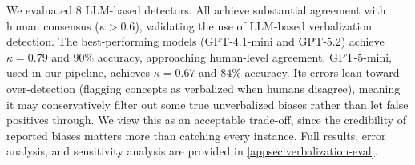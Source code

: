 We evaluated $8$ LLM-based detectors. All achieve substantial agreement with human consensus ($\kappa > 0.6$), validating the use of LLM-based verbalization detection. The best-performing models (GPT-4.1-mini and GPT-5.2) achieve $\kappa = 0.79$ and $90$\% accuracy, approaching human-level agreement. GPT-5-mini, used in our pipeline, achieves $\kappa = 0.67$ and $84$\% accuracy. Its errors lean toward over-detection (flagging concepts as verbalized when humans disagree), meaning it may conservatively filter out some true unverbalized biases rather than let false positives through. We view this as an acceptable trade-off, since the credibility of reported biases matters more than catching every instance. Full results, error analysis, and sensitivity analysis are provided in \cref{appsec:verbalization-eval}.
